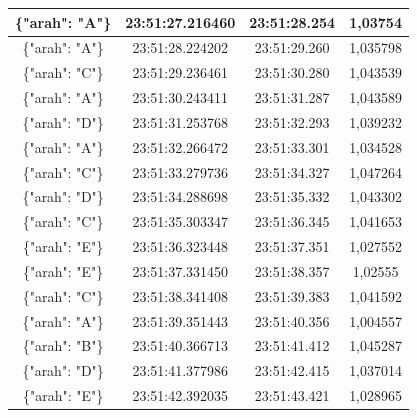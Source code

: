 \begin{longtable}{|ccc|c|}
  \multicolumn{1}{|c|}{\{"arah": "A"\}} & \multicolumn{1}{c|}{23:51:27.216460} & 23:51:28.254       & 1,03754     \\ \hline
  \multicolumn{1}{|c|}{\{"arah": "A"\}} & \multicolumn{1}{c|}{23:51:28.224202} & 23:51:29.260       & 1,035798    \\ \hline
  \multicolumn{1}{|c|}{\{"arah": "C"\}} & \multicolumn{1}{c|}{23:51:29.236461} & 23:51:30.280       & 1,043539    \\ \hline
  \multicolumn{1}{|c|}{\{"arah": "A"\}} & \multicolumn{1}{c|}{23:51:30.243411} & 23:51:31.287       & 1,043589    \\ \hline
  \multicolumn{1}{|c|}{\{"arah": "D"\}} & \multicolumn{1}{c|}{23:51:31.253768} & 23:51:32.293       & 1,039232    \\ \hline
  \multicolumn{1}{|c|}{\{"arah": "A"\}} & \multicolumn{1}{c|}{23:51:32.266472} & 23:51:33.301       & 1,034528    \\ \hline
  \multicolumn{1}{|c|}{\{"arah": "C"\}} & \multicolumn{1}{c|}{23:51:33.279736} & 23:51:34.327       & 1,047264    \\ \hline
  \multicolumn{1}{|c|}{\{"arah": "D"\}} & \multicolumn{1}{c|}{23:51:34.288698} & 23:51:35.332       & 1,043302    \\ \hline
  \multicolumn{1}{|c|}{\{"arah": "C"\}} & \multicolumn{1}{c|}{23:51:35.303347} & 23:51:36.345       & 1,041653    \\ \hline
  \multicolumn{1}{|c|}{\{"arah": "E"\}} & \multicolumn{1}{c|}{23:51:36.323448} & 23:51:37.351       & 1,027552    \\ \hline
  \multicolumn{1}{|c|}{\{"arah": "E"\}} & \multicolumn{1}{c|}{23:51:37.331450} & 23:51:38.357       & 1,02555     \\ \hline
  \multicolumn{1}{|c|}{\{"arah": "C"\}} & \multicolumn{1}{c|}{23:51:38.341408} & 23:51:39.383       & 1,041592    \\ \hline
  \multicolumn{1}{|c|}{\{"arah": "A"\}} & \multicolumn{1}{c|}{23:51:39.351443} & 23:51:40.356       & 1,004557    \\ \hline
  \multicolumn{1}{|c|}{\{"arah": "B"\}} & \multicolumn{1}{c|}{23:51:40.366713} & 23:51:41.412       & 1,045287    \\ \hline
  \multicolumn{1}{|c|}{\{"arah": "D"\}} & \multicolumn{1}{c|}{23:51:41.377986} & 23:51:42.415       & 1,037014    \\ \hline
  \multicolumn{1}{|c|}{\{"arah": "E"\}} & \multicolumn{1}{c|}{23:51:42.392035} & 23:51:43.421       & 1,028965    \\ \hline

\end{longtable}
